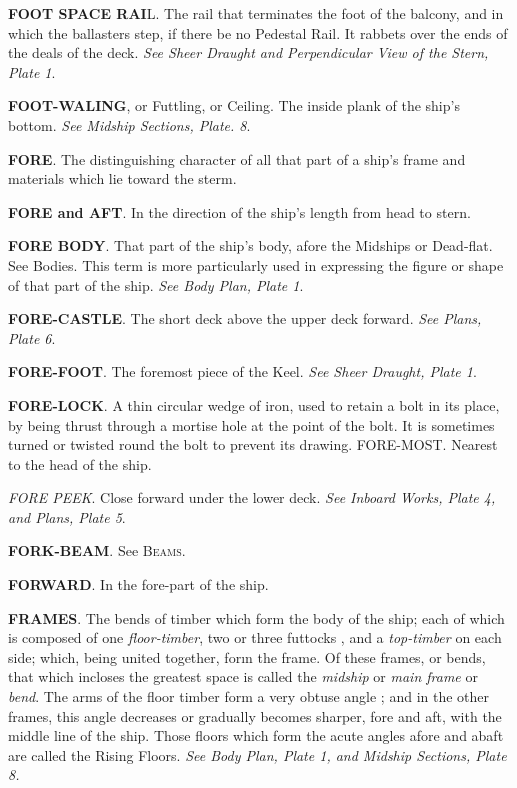 \textbf{FOOT SPACE RAI}L. The rail that terminates the foot of the balcony, and in which the ballasters step, if there be no Pedestal Rail. It rabbets over the ends of the deals of the deck. \textit{See Sheer Draught and Perpendicular View of the Stern, Plate 1}. 

\textbf{FOOT-WALING}, or Futtling, or Ceiling. The inside plank of the ship's bottom. \textit{See Midship Sections, Plate. 8}. 

\textbf{FORE}. The distinguishing character of all that part of a ship’s frame and materials which lie toward the sterm.

\textbf{FORE and AFT}. In the direction of the ship's length from head to stern. 

\textbf{FORE BODY}. That part of the ship’s body, afore the Midships or Dead-flat. See Bodies. This term is more particularly used in expressing the figure or shape of that part of the ship. \textit{See Body Plan, Plate 1}. 

\textbf{FORE-CASTLE}. The short deck above the upper deck forward. \textit{See Plans, Plate 6}. 

\textbf{FORE-FOOT}. The foremost piece of the Keel. \textit{See Sheer Draught, Plate 1}. 

\textbf{FORE-LOCK}. A thin circular wedge of iron, used to retain a bolt in its place, by being thrust through a mortise hole at the point of the bolt. It is sometimes turned or twisted round the bolt to prevent its drawing. FORE-MOST. Nearest to the head of the ship. 

\textit{FORE PEEK}. Close forward under the lower deck. \textit{See Inboard Works, Plate 4, and Plans, Plate 5}. 

\textbf{FORK-BEAM}. See \textsc{Beams}. 

\textbf{FORWARD}. In the fore-part of the ship. 

\textbf{FRAMES}. The bends of timber which form the body of the ship; each of which is composed of one \textit{floor-timber}, two or three futtocks , and a \textit{top-timber} on each side; which, being united together, forın the frame. Of these frames, or bends, that which incloses the greatest space is called the \textit{midship} or \textit{main frame} or \textit{bend}. The arms of the floor timber form a very obtuse angle ; and in the other frames, this angle decreases or gradually becomes sharper, fore and aft, with the middle line of the ship. Those floors which form the acute angles afore and abaft are called the Rising Floors. \textit{See Body Plan, Plate 1, and Midship Sections, Plate 8. }

